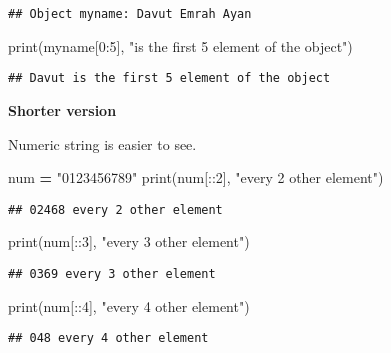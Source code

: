 \documentclass[
]{book}
\newenvironment{Shaded}{\begin{snugshade}}{\end{snugshade}}
\newcommand{\BuiltInTok}[1]{#1}
\newcommand{\DecValTok}[1]{\textcolor[rgb]{0.00,0.00,0.81}{#1}}
\newcommand{\NormalTok}[1]{#1}
\newcommand{\OperatorTok}[1]{\textcolor[rgb]{0.81,0.36,0.00}{\textbf{#1}}}
\newcommand{\StringTok}[1]{\textcolor[rgb]{0.31,0.60,0.02}{#1}}
\begin{document}
\begin{verbatim}
## Object myname: Davut Emrah Ayan
\end{verbatim}

\begin{Shaded}
\begin{Highlighting}[]
\BuiltInTok{print}\NormalTok{(myname[}\DecValTok{0}\NormalTok{:}\DecValTok{5}\NormalTok{], }\StringTok{"is the first 5 element of the object"}\NormalTok{)}
\end{Highlighting}
\end{Shaded}

\begin{verbatim}
## Davut is the first 5 element of the object
\end{verbatim}

\textbf{Shorter version}

Numeric string is easier to see.

\begin{Shaded}
\begin{Highlighting}[]
\NormalTok{num }\OperatorTok{=} \StringTok{"0123456789"}
\BuiltInTok{print}\NormalTok{(num[::}\DecValTok{2}\NormalTok{], }\StringTok{"every 2 other element"}\NormalTok{)}
\end{Highlighting}
\end{Shaded}

\begin{verbatim}
## 02468 every 2 other element
\end{verbatim}

\begin{Shaded}
\begin{Highlighting}[]
\BuiltInTok{print}\NormalTok{(num[::}\DecValTok{3}\NormalTok{], }\StringTok{"every 3 other element"}\NormalTok{)}
\end{Highlighting}
\end{Shaded}

\begin{verbatim}
## 0369 every 3 other element
\end{verbatim}

\begin{Shaded}
\begin{Highlighting}[]
\BuiltInTok{print}\NormalTok{(num[::}\DecValTok{4}\NormalTok{], }\StringTok{"every 4 other element"}\NormalTok{)}
\end{Highlighting}
\end{Shaded}

\begin{verbatim}
## 048 every 4 other element
\end{verbatim}
\end{document}
